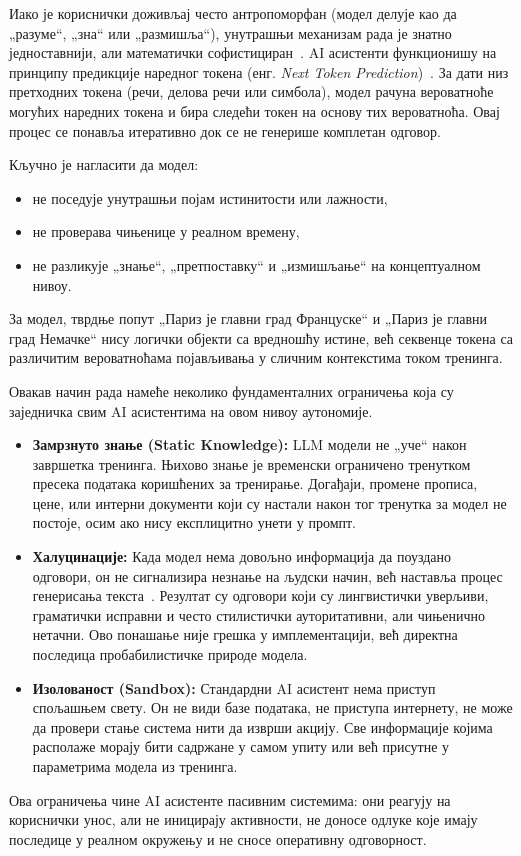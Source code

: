Иако је кориснички доживљај често антропоморфан (модел делује као да „разуме“, „зна“ или „размишља“),
унутрашњи механизам рада је знатно једноставнији, али математички софистициран~\cite{bender2021}.
AI асистенти функционишу на принципу предикције наредног токена (енг. \textit{Next Token Prediction})~\cite{vaswani2017,brown2020}.
За дати низ претходних токена (речи, делова речи или симбола), модел рачуна вероватноће могућих наредних
токена и бира следећи токен на основу тих вероватноћа.
Овај процес се понавља итеративно док се не генерише комплетан одговор.

Кључно је нагласити да модел:
\begin{itemize}
    \item не поседује унутрашњи појам истинитости или лажности,
    \item не проверава чињенице у реалном времену,
    \item не разликује „знање“, „претпоставку“ и „измишљање“ на концептуалном нивоу.
\end{itemize}
\noindent
За модел, тврдње попут „Париз је главни град Француске“ и „Париз је главни град Немачке“ нису
логички објекти са вредношћу истине, већ секвенце токена са различитим вероватноћама појављивања
у сличним контекстима током тренинга.

Овакав начин рада намеће неколико фундаменталних ограничења која су заједничка свим AI асистентима
на овом нивоу аутономије.

\begin{itemize}
    \item \textbf{Замрзнуто знање (Static Knowledge):}
    LLM модели не „уче“ након завршетка тренинга.
    Њихово знање је временски ограничено тренутком пресека података коришћених за тренирање.
    Догађаји, промене прописа, цене, или интерни документи који су настали након тог тренутка
    за модел не постоје, осим ако нису експлицитно унети у промпт.

    \item \textbf{Халуцинације:}
    Када модел нема довољно информација да поуздано одговори, он не сигнализира незнање
    на људски начин, већ наставља процес генерисања текста~\cite{ji2023hallucination}.
    Резултат су одговори који су лингвистички уверљиви, граматички исправни и често стилистички
    ауторитативни, али чињенично нетачни.
    Ово понашање није грешка у имплементацији, већ директна последица пробабилистичке природе модела.

    \item \textbf{Изолованост (Sandbox):}  
    Стандардни AI асистент нема приступ спољашњем свету.
    Он не види базе података, не приступа интернету, не може да провери стање система нити да
    изврши акцију.
    Све информације којима располаже морају бити садржане у самом упиту или већ присутне у
    параметрима модела из тренинга.
\end{itemize}
\noindent
Ова ограничења чине AI асистенте пасивним системима:
они реагују на кориснички унос, али не иницирају активности, не доносе одлуке које имају последице
у реалном окружењу и не сносе оперативну одговорност.

